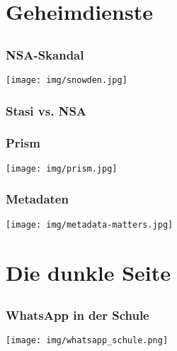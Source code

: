 \documentclass[12pt, table]{beamer}
\begin{document}
\section{Geheimdienste}
  \subsection{}

  \begin{frame}
    \frametitle{NSA-Skandal}
    \begin{center}
      \texttt{[image: img/snowden.jpg]}
    \end{center}	
  \end{frame}

  \begin{frame}
    \frametitle{Stasi vs. NSA}
    \begin{center}
    \end{center}
  \end{frame}

  \begin{frame}
    \frametitle{Prism}
    \pause
    \begin{center}
      \texttt{[image: img/prism.jpg]}
    \end{center}
  \end{frame}
  
  \begin{frame}
    \frametitle{Metadaten}
    \pause
    \begin{center}
      \texttt{[image: img/metadata-matters.jpg]}
    \end{center}
  \end{frame}

\section{Die dunkle Seite}
  \subsection{}
  
  \begin{frame}
    \frametitle{WhatsApp in der Schule}
    \begin{center}
      \texttt{[image: img/whatsapp\_schule.png]} 
    \end{center}
  \end{frame}
\end{document}

